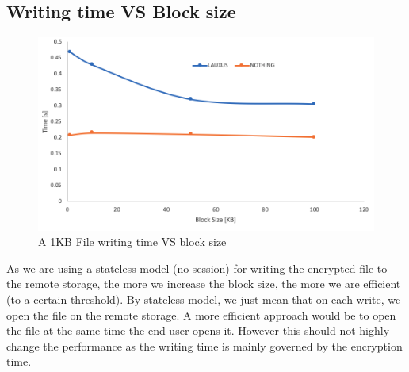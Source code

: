 \documentclass[../main.tex]{subfiles}
\begin{document}
\subsection{Writing time VS Block size}
\begin{figure}[h]
    \centering
    \includegraphics[width=\textwidth]{images/appendix/perf_write_per_block_size}
    
    \caption{A 1KB File writing time VS block size}
    \label{appendix:figure:perf_time_per_block_size}
\end{figure}
\par As we are using a stateless model (no session) for writing the encrypted file to the remote storage, the more we increase the block size, the more we are efficient (to a certain threshold). By stateless model, we just mean that on each write, we open the file on the remote storage. A more efficient approach would be to open the file at the same time the end user opens it. However this should not highly change the performance as the writing time is mainly governed by the encryption time.
\end{document}

